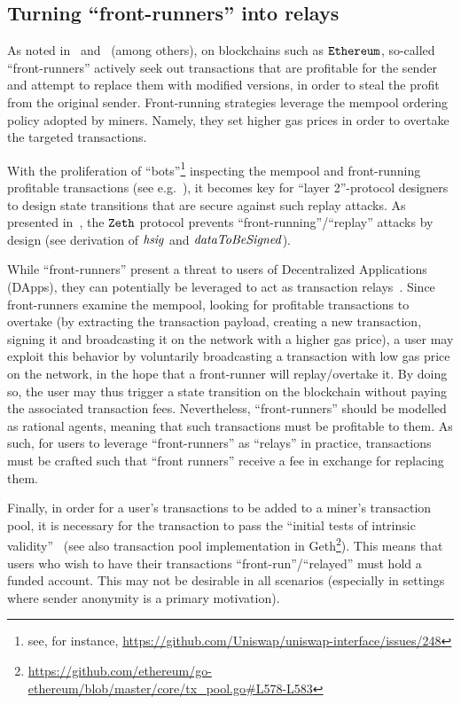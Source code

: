 \subsection{Turning ``front-runners'' into relays}\label{preliminaries:introduction:front-runners}

As noted in~\cite{daian2019flash} and~\cite{surrogeth-blogpost} (among others), on blockchains such as $\texttt{Ethereum}$, so-called ``front-runners'' actively seek out transactions that are profitable for the sender and attempt to replace them with modified versions, in order to steal the profit from the original sender. Front-running strategies leverage the mempool ordering policy adopted by miners. Namely, they set higher gas prices in order to overtake the targeted transactions.

With the proliferation of ``bots''\footnote{see, for instance, \url{https://github.com/Uniswap/uniswap-interface/issues/248}} inspecting the mempool and front-running profitable transactions (see e.g.~\cite{danrobinson-dark-forest}), it becomes key for ``layer 2''-protocol designers to design state transitions that are secure against such replay attacks.
As presented in~\cite[Section 2.3]{zeth-protocol}, the $\texttt{Zeth}$ protocol prevents ``front-running''/``replay'' attacks by design (see derivation of $\mathit{hsig}$ and $\mathit{dataToBeSigned}$).

While ``front-runners'' present a threat to users of Decentralized Applications (DApps), they can potentially be leveraged to act as transaction relays~\cite{surrogeth-blogpost}. Since front-runners examine the mempool, looking for profitable transactions to overtake (by extracting the transaction payload, creating a new transaction, signing it and broadcasting it on the network with a higher gas price), a user may exploit this behavior by voluntarily broadcasting a transaction with low gas price on the network, in the hope that a front-runner will replay/overtake it. By doing so, the user may thus trigger a state transition on the blockchain without paying the associated transaction fees. Nevertheless, ``front-runners'' should be modelled as rational agents, meaning that such transactions must be profitable to them. As such, for users to leverage ``front-runners'' as ``relays'' in practice, transactions must be crafted such that ``front runners'' receive a fee in exchange for replacing them.

Finally, in order for a user's transactions to be added to a miner's transaction pool, it is necessary for the transaction to pass the ``initial tests of intrinsic validity''~\cite[Section 6]{ethyellowpaper} (see also transaction pool implementation in Geth\footnote{\url{https://github.com/ethereum/go-ethereum/blob/master/core/tx_pool.go\#L578-L583}}). This means that users who wish to have their transactions ``front-run''/``relayed'' must hold a funded \ethereum{} account. This may not be desirable in all scenarios (especially in settings where sender anonymity is a primary motivation).

